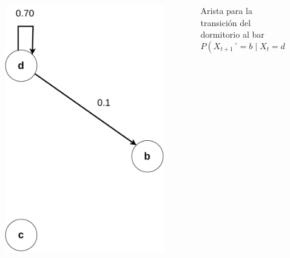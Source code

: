 \documentclass[11pt]{beamer}
\begin{document}
\begin{frame}
	\begin{columns}
		\begin{column}{0.5\textwidth}
			\vspace{-0.8cm}
			\begin{figure}
				\includegraphics[scale=0.5]{images/markov_dos.pdf}
			\end{figure}
		\end{column}
		\begin{column}{0.5\textwidth}
			
		Arista para la transición del dormitorio al bar
					\[P(X_{t+1}´ = b \mid X_t = d)=0.1\]
		\end{column}

	\end{columns}
	
\end{frame}
\end{document}
